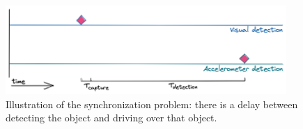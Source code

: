 \begin{figure}[ht]
\begin{center}
\includegraphics[width=0.95\textwidth,keepaspectratio]{images/2_literature/time-line-synchonization.png}
\end{center}
\captionsetup{width=.90\textwidth}
\caption{Illustration of the synchronization problem: there is a delay between detecting the object and driving over that object.}
\label{fig:synchronization}
\end{figure}






